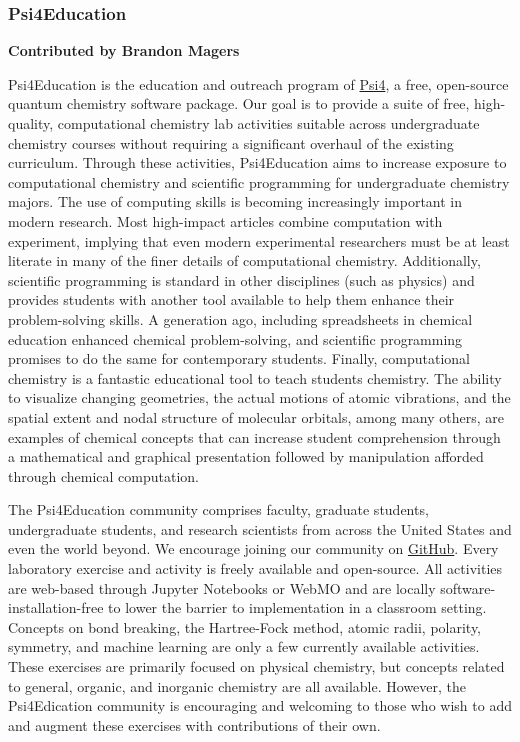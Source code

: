 \documentclass[9pt,review]{livecoms}
\begin{document}
\subsubsection{Psi4Education}

\textbf{Contributed by Brandon Magers}

Psi4Education is the education and outreach program of \href{psicode.org}{Psi4}, 
a free, open-source quantum chemistry software package.  Our goal is to provide a suite of free, high-quality, computational chemistry lab activities suitable across undergraduate chemistry courses without requiring a significant overhaul of the existing curriculum. 
Through these activities, Psi4Education aims to increase exposure to computational chemistry and scientific programming for undergraduate chemistry majors.  
The use of computing skills is becoming increasingly important in modern research. 
Most high-impact articles combine computation with experiment, implying that even modern experimental researchers must be at least literate in many of the finer details of computational chemistry. 
Additionally, scientific programming is standard in other disciplines (such as physics) and provides students with another tool available to help them enhance their problem-solving skills. 
A generation ago, including spreadsheets in chemical education enhanced chemical problem-solving, and scientific programming promises to do the same for contemporary students. 
Finally, computational chemistry is a fantastic educational tool to teach students chemistry. 
The ability to visualize changing geometries, the actual motions of atomic vibrations, and the spatial extent and nodal structure of molecular orbitals, among many others, are examples of chemical concepts that can increase student comprehension through a mathematical and graphical presentation followed by manipulation afforded through chemical computation.

The Psi4Education community comprises faculty, graduate students, undergraduate students, and research scientists from across the United States and even the world beyond.  
We encourage joining our community on \href{https://github.com/Psi4Education}{GitHub}.  
Every laboratory exercise and activity is freely available and open-source.  
All activities are web-based through Jupyter Notebooks or WebMO and are locally software-installation-free to lower the barrier to implementation in a classroom setting.  
Concepts on bond breaking, the Hartree-Fock method, atomic radii, polarity, symmetry, and machine learning are only a few currently available activities.  
These exercises are primarily focused on physical chemistry, but concepts related to general, organic, and inorganic chemistry are all available. 
However, the Psi4Edication community is encouraging and welcoming to those who wish to add and augment these exercises with contributions of their own.
\end{document}
